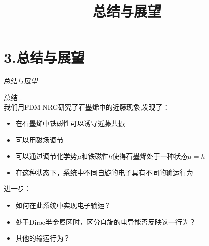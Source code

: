 \documentclass[9pt,t]{beamer} %
\begin{document}
\section{3.总结与展望}
\title{总结与展望}
\begin{frame}[t]{总结与展望}
\vspace{0.6cm}
\qquad %

\vspace{0.1cm}
总结：\\
\qquad 我们用FDM-NRG研究了石墨烯中的近藤现象,发现了：
\vspace{0.2cm}
\begin{itemize}
\item 在石墨烯中铁磁性可以诱导近藤共振
\item 可以用磁场调节
\item 可以通过调节化学势$\mu$和铁磁性$h$使得石墨烯处于一种状态$\mu=h$
\item 在这种状态下，系统中不同自旋的电子具有不同的输运行为
\end{itemize}

\vspace{0.3cm}
进一步：
\begin{itemize}
\item 如何在此系统中实现电子输运？
\item 处于Dirac半金属区时，区分自旋的电导能否反映这一行为？
\item 其他的输运行为？
\end{itemize}

\end{frame}



\end{document}
